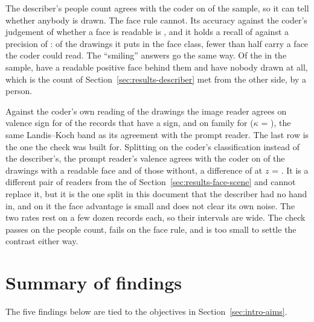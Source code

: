 The describer's people count agrees with the coder on \HcPeopleAcc{} of the sample, so it can tell whether anybody is drawn. The face rule cannot. Its accuracy against the coder's judgement of whether a face is readable is \HcFaceAcc{}, and it holds a recall of \HcFaceRec{} against a precision of \HcFacePrec{}: of the drawings it puts in the face class, fewer than half carry a face the coder could read. The ``smiling'' answers go the same way. Of the \HcSmileN{} in the sample, \HcSmileTrue{} have a readable positive face behind them and \HcSmileNoPerson{} have nobody drawn at all, which is the count of Section~\ref{sec:results-describer} met from the other side, by a person.

Against the coder's own reading of the drawings the image reader agrees on valence sign for \HcReaderSign{} of the records that have a sign, and on family for \HcReaderFam{} ($\kappa$ = \HcReaderKappa{}), the same Landis--Koch band as its agreement with the prompt reader. The last row is the one the check was built for. Splitting on the coder's classification instead of the describer's, the prompt reader's valence agrees with the coder on \HcPromptFace{} of the drawings with a readable face and \HcPromptScene{} of those without, a difference of \HcPromptDiffPp{} at $z$ = \HcPromptDiffZ{}. It is a different pair of readers from the \DiffSignPp{} of Section~\ref{sec:results-face-scene} and cannot replace it, but it is the one split in this document that the describer had no hand in, and on it the face advantage is small and does not clear its own noise. The two rates rest on a few dozen records each, so their intervals are wide. The check passes on the people count, fails on the face rule, and is too small to settle the contrast either way.



\section{Summary of findings}
\label{sec:results-summary}

The five findings below are tied to the objectives in Section~\ref{sec:intro-aims}.

